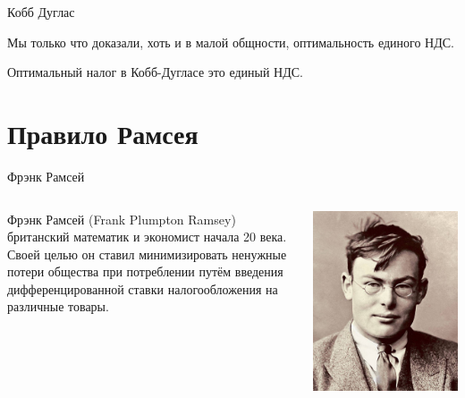 \documentclass{beamer}
\begin{document}
\begin{frame}{Кобб Дуглас}

Мы только что доказали, хоть и в малой общности, оптимальность единого НДС.

\begin{lemma}
Оптимальный налог в Кобб-Дугласе это единый НДС.
\end{lemma}

\end{frame}

\section{Правило Рамсея}

\begin{frame}{Фрэнк Рамсей}
\begin{columns}
\begin{column}{0.5\textwidth}
   \alert{Фрэнк Рамсей} (Frank Plumpton Ramsey) британский математик и экономист начала 20 века. Своей целью он ставил \alert{минимизировать ненужные потери общества} при потреблении путём введения \alert{дифференцированной ставки налогообложения} на различные товары. 
\end{column}
\begin{column}{0.5\textwidth}  %
    \begin{center}
     \includegraphics[width=1\textwidth]{ramsay}
     \end{center}
\end{column}
\end{columns}
\end{frame}
\end{document}
